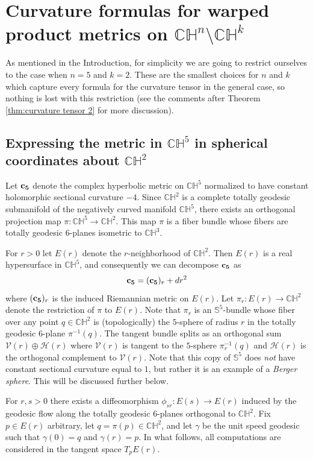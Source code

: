 \documentclass[10pt]{amsart}
\def\S{\mathcal{S}}
\def\g{\gamma}
\def\H{\mathbb{H}}
\def\C{\mathbb{C}}
\def\S{\mathbb{S}}
\theoremstyle{definition}
\theoremstyle{remark}
\numberwithin{equation}{section}
\begin{document}
\section{Curvature formulas for warped product metrics on $\C \H^n \setminus \C \H^k$}\label{section:chn/chk}

As mentioned in the Introduction, for simplicity we are going to restrict ourselves to the case when $n=5$ and $k=2$.  
These are the smallest choices for $n$ and $k$ which capture every formula for the curvature tensor in the general case, so nothing is lost with this restriction (see the comments after Theorem \ref{thm:curvature tensor 2} for more discussion).

\subsection{Expressing the metric in $\C \H^5$ in spherical coordinates about $\C \H^2$}
Let ${\bf c_5}$ denote the complex hyperbolic metric on $\C \H^5$ normalized to have constant holomorphic sectional curvature $-4$.  
Since $\C \H^2$ is a complete totally geodesic submanifold of the negatively curved manifold $\C \H^5$, there exists an orthogonal projection map $\pi : \C \H^5 \to \C \H^2$.  
This map $\pi$ is a fiber bundle whose fibers are totally geodesic $6$-planes isometric to $\C \H^3$.  

For $r > 0$ let $E(r)$ denote the $r$-neighborhood of $\C \H^2$.  
Then $E(r)$ is a real hypersurface in $\C \H^5$, and consequently we can decompose ${\bf c_5}$ as
	\begin{equation*}
	{\bf c_5} = ({\bf c_5})_r + dr^2
	\end{equation*}
where $({\bf c_5})_r$ is the induced Riemannian metric on $E(r)$.  
Let $\pi_r : E(r) \to \C \H^2$ denote the restriction of $\pi$ to $E(r)$.  
Note that $\pi_r$ is an $\S^5$-bundle whose fiber over any point $q \in \C \H^2$ is (topologically) the $5$-sphere of radius $r$ in the totally geodesic $6$-plane $\pi^{-1}(q)$.  
The tangent bundle splits as an orthogonal sum $\mathcal{V}(r) \oplus \mathcal{H}(r)$ where $\mathcal{V}(r)$ is tangent to the $5$-sphere $\pi_r^{-1}(q)$ and $\mathcal{H}(r)$ is the orthogonal complement to $\mathcal{V}(r)$.  
Note that this copy of $\S^5$ does {\em not} have constant sectional curvature equal to $1$, but rather it is an example of a {\em Berger sphere}.  
This will be discussed further below.

For $r, s > 0$ there exists a diffeomorphism $\phi_{sr}: E(s) \to E(r)$ induced by the geodesic flow along the totally geodesic $6$-planes orthogonal to $\C \H^2$.   
Fix $p \in E(r)$ arbitrary, let $q = \pi(p) \in \C \H^2$, and let $\g$ be the unit speed geodesic such that $\g(0) = q$ and $\g(r) = p$. 
In what follows, all computations are considered in the tangent space $T_p E(r)$. 
\end{document}
